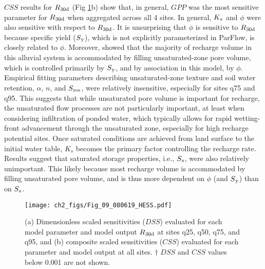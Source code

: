 $CSS$ results for $R\textsubscript{30d}$ (Fig \ref{fig:DSS_r30}b) show that, in general, $GPP$ was the most sensitive parameter for $R\textsubscript{30d}$ when aggregated across all 4 sites. In general, $K\textsubscript{s}$ and $\phi$ were also sensitive with respect to $R\textsubscript{30d}$. It is unsurprising that $\phi$ is sensitive to $R\textsubscript{30d}$ because specific yield ($S\textsubscript{y}$), which is not explicitly parameterized in ParFlow, is closely related to $\phi$. Moreover, \cite{maples_2019} showed that the majority of recharge volume in this alluvial system is accommodated by filling unsaturated-zone pore volume, which is controlled primarily by $S\textsubscript{y}$, and by association in this model, by $\phi$. Empirical fitting parameters describing unsaturated-zone texture and soil water retention, $\alpha$, $n$, and $S\textsubscript{res}$, were relatively insensitive, especially for sites q75 and q95. This suggests that while unsaturated pore volume is important for recharge, the unsaturated flow processes are not particularly important, at least when considering infiltration of ponded water, which typically allows for rapid wetting-front advancement through the unsaturated zone, especially for high recharge potential sites. Once saturated conditions are achieved from land surface to the initial water table, $K_s$ becomes the primary factor controlling the recharge rate.  Results suggest that saturated storage properties, i.e., $S\textsubscript{s}$, were also relatively unimportant. This likely because most recharge volume is accommodated by filling unsaturated pore volume, and is thus more dependent on $\phi$ (and $S\textsubscript{y}$) than on $S\textsubscript{s}$.

\begin{figure*}[t]
\centering
\texttt{[image: ch2\_figs/Fig\_09\_080619\_HESS.pdf]}
\caption{(a) Dimensionless scaled sensitivities ($DSS$) evaluated for each model parameter and model output $R\textsubscript{30d}$ at sites q25, q50, q75, and q95, and (b) composite scaled sensitivities ($CSS$) evaluated for each parameter and model output at all sites. $\dagger$ $DSS$ and $CSS$ values below 0.001 are not shown.}
\label{fig:DSS_r30}
\end{figure*}

